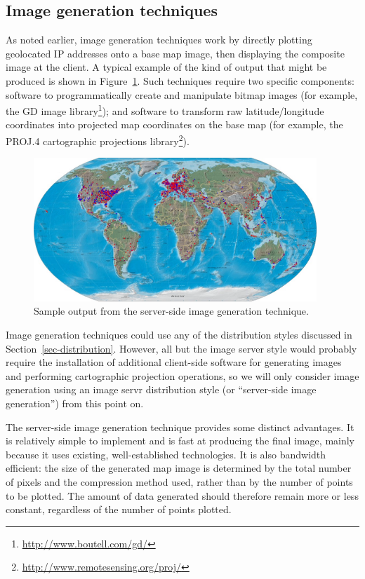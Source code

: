 \documentclass[acmtocl,acmnow]{acmtrans2m}
\begin{document}
\subsection{Image generation techniques}
\label{sec-image-gen}

As noted earlier, image generation techniques work by directly plotting
geolocated IP addresses onto a base map image, then displaying the
composite image at the client. A typical example of the kind of output
that might be produced is shown in Figure~\ref{fig-image}. Such
techniques require two specific components: software to programmatically
create and manipulate bitmap images (for example, the GD image
library\footnote{\url{http://www.boutell.com/gd/}}); and software to
transform raw latitude/longitude coordinates into projected map
coordinates on the base map (for example, the PROJ.4 cartographic
projections library\footnote{\url{http://www.remotesensing.org/proj/}}).


\begin{figure}
	\begin{center}
		\includegraphics[width=0.95\textwidth,keepaspectratio]{ImageGeneration-full}
	\end{center}
	\caption{Sample output from the server-side image generation technique.}
	\label{fig-image}
\end{figure}


Image generation techniques could use any of the distribution styles
discussed in Section~\ref{sec-distribution}. However, all but the image
server style would probably require the installation of additional
client-side software for generating images and performing cartographic
projection operations, so we will only consider image generation using
an image servr distribution style (or ``server-side image generation'')
from this point on.

The server-side image generation technique provides some distinct
advantages. It is relatively simple to implement and is fast at
producing the final image, mainly because it uses existing,
well-established technologies. It is also bandwidth efficient: the size
of the generated map image is determined by the total number of pixels
and the compression method used, rather than by the number of points to
be plotted. The amount of data generated should therefore remain more or
less constant, regardless of the number of points plotted.
\end{document}
